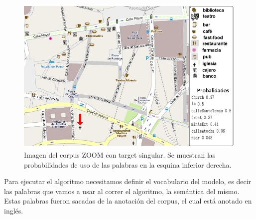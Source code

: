 \begin{figure}
\begin{center}
\includegraphics[width=\textwidth]{images/corpus/mapa6-prob.png}
\caption{Imagen del corpus ZOOM con target singular. Se muestran las probabilidades de uso de las palabras en la esquina inferior derecha.}
\label{mapa-zoom1}
\end{center}
\end{figure}

Para ejecutar el algoritmo necesitamos definir el vocabulario del modelo, es decir las palabras que vamos a usar al correr el algoritmo, la sem\'antica del mismo. Estas palabras fueron sacadas de la anotaci\'on del corpus, el cual est\'a anotado en ingl\'es.\\


